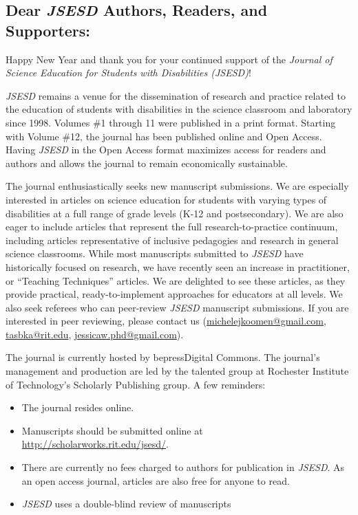 \documentclass{sig-alternate} %
\begin{document}
\begin{large}
\section*{Dear \textit{\textbf{JSESD}} Authors, Readers, and Supporters:}
Happy New Year and thank you for your continued support of the \textit{Journal of Science Education for Students with Disabilities (JSESD)}!

\textit{JSESD} remains a venue for the dissemination of research and practice related to the education of students with disabilities in the science classroom and laboratory since 1998. Volumes \#1 through 11 were published in a print format. Starting with Volume \#12, the journal has been published online and Open Access. Having \textit{JSESD} in the Open Access format maximizes access for readers and authors and allows the journal to remain economically sustainable.

The journal enthusiastically seeks new manuscript submissions. We are especially interested in articles on science education for students with varying types of disabilities at a full range of grade levels (K-12 and postsecondary). We are also eager to include articles that represent the full research-to-practice continuum, including articles representative of inclusive pedagogies and research in general science classrooms. While most manuscripts submitted to \textit{JSESD} have historically focused on research, we have recently seen an increase in practitioner, or “Teaching Techniques” articles. We are delighted to see these articles, as they provide practical, ready-to-implement approaches for educators at all levels. We also seek referees who can peer-review \textit{JSESD} manuscript submissions. If you are interested in peer reviewing, please contact us (\href{mailto:michelejkoomen@gmail.com}{michelejkoomen@gmail.com}, \href{mailto:tasbka@rit.edu}{tasbka@rit.edu}, \href{mailto:jessicaw.phd@gmail.com}{jessicaw.phd@gmail.com}).

The journal is currently hosted by bepress\texttrademark Digital Commons. The journal’s management and production are led by the talented group at Rochester Institute of Technology’s Scholarly Publishing group. A few reminders:

\begin{itemize}[label=--]
    \item The journal resides online.
    \item Manuscripts should be submitted online at \url{http://scholarworks.rit.edu/jsesd/}.
    \item There are currently no fees charged to authors for publication in \textit{JSESD}. As an open access journal, articles are also free for anyone to read.
    \item \textit{JSESD} uses a double-blind review of manuscripts
\end{itemize}


\end{large}
\end{document}
